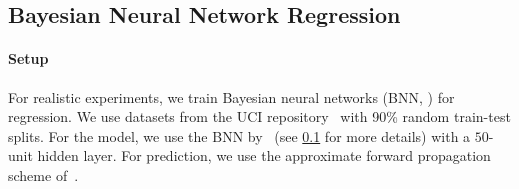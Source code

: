 
% 







  \vspace{-0.1in}
\subsection{Bayesian Neural Network Regression}\label{section:bnn}
  \vspace{-0.07in}
\paragraph{Setup}
For realistic experiments, we train Bayesian neural networks (BNN, \citealt{neal_bayesian_1996}) for regression.
We use datasets from the UCI repository~\cite{Dua:2019} with 90\% random train-test splits.
For the model, we use the BNN by~\citet{pmlr-v37-hernandez-lobatoc15} (see \cref{section:bnn} for more details) with a \(50\)-unit hidden layer.
For prediction, we use the approximate forward propagation scheme of~\citet{pmlr-v37-hernandez-lobatoc15}.

